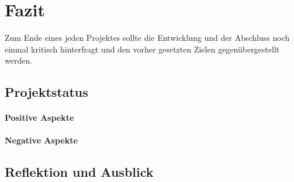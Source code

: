 
\chapter{Fazit}

Zum Ende eines jeden Projektes sollte die Entwicklung
und der Abschluss noch einmal kritisch hinterfragt und den
vorher gesetzten Zielen gegenübergestellt werden.

\section{Projektstatus}

\subsubsection{Positive Aspekte}

\subsubsection{Negative Aspekte}

\section{Reflektion und Ausblick}
